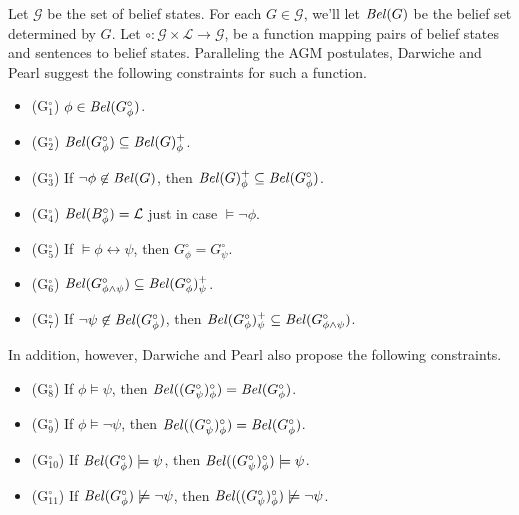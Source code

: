 Let $\mathcal{G}$ be the set of belief states.
For each $G \in \mathcal{G}$, we'll let $\text{\textit{Bel}}(G)$ be the belief set determined by $G$.
Let $\circ: \mathcal{G} \times \mathcal{L} \rightarrow \mathcal{G}$, be a function mapping pairs of belief states and sentences to belief states.
Paralleling the AGM postulates, Darwiche and Pearl suggest the following constraints for such a function.
\begin{itemize}
\item[](G$^\circ_1$) \quad $\phi \in \text{\textit{Bel}}(G^\circ_\phi)$.
\item[](G$^\circ_2$) \quad $\text{\textit{Bel}}(G^\circ_\phi) \subseteq \text{\textit{Bel}}(G)^+_\phi$.
\item[](G$^\circ_3$) \quad If $\lnot \phi \not \in \text{\textit{Bel}}(G)$, then $\text{\textit{Bel}}(G)^+_\phi \subseteq \text{\textit{Bel}}(G^\circ_\phi)$.
\item[](G$^\circ_4$) \quad $\text{\textit{Bel}}(B^\circ_\phi) = \mathcal{L}$ just in case $ \models \lnot \phi$.
\item[](G$^\circ_5$) \quad If $\models \phi \leftrightarrow \psi$, then $G^\circ_\phi = G^\circ_\psi$.
\item[](G$^\circ_6$) \quad $\text{\textit{Bel}}(G^\circ_{\phi \wedge \psi}) \subseteq \text{\textit{Bel}}(G^\circ_\phi)^+_\psi$.
\item[](G$^\circ_7$) \quad If $\lnot \psi \not \in \text{\textit{Bel}}(G^\circ_\phi)$, then $\text{\textit{Bel}}(G^\circ_\phi)^+_\psi \subseteq \text{\textit{Bel}}(G^\circ_{\phi \wedge \psi})$.
\end{itemize}
In addition, however, Darwiche and Pearl also propose the following constraints.
\begin{itemize}
\item[](G$^\circ_8$) \quad If $\phi \models \psi$, then $\text{\textit{Bel}}((G^\circ_\psi)^\circ_\phi) = \text{\textit{Bel}}(G^\circ_\phi)$.
\item[](G$^\circ_9$) \quad If $\phi \models \lnot \psi$, then $\text{\textit{Bel}}((G^\circ_\psi)^\circ_\phi) = \text{\textit{Bel}}(G^\circ_\phi)$.
\item[](G$^\circ_{10}$) \quad If $\text{\textit{Bel}}(G^\circ_\phi) \models \psi$, then $\text{\textit{Bel}}((G^\circ_\psi)^\circ_\phi) \models \psi$.
\item[](G$^\circ_{11}$) \quad If  $\text{\textit{Bel}}(G^\circ_\phi) \not \models \lnot \psi$, then $\text{\textit{Bel}}((G^\circ_\psi)^\circ_\phi) \not \models \lnot \psi$.
\end{itemize}


